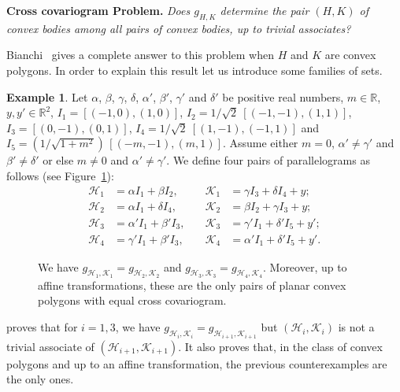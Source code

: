 \documentclass[a4paper]{amsart}
\theoremstyle{definition}
\newtheorem{example}[theorem]{Example}
\numberwithin{equation}{section}
\begin{document}
\textbf{Cross covariogram Problem.}
\emph{Does $g_{H,K}$ determine the pair $(H,K)$ of convex bodies among all pairs of convex bodies, up to trivial associates?}
\smallskip

Bianchi~\cite{B4} gives a complete answer to this problem when $H$ and $K$ are convex polygons. In order to explain this result let us introduce some families of sets.
\begin{example}\label{parallelograms}
Let ${{\alpha}}$, ${{\beta}}$, ${{\gamma}}$, ${{\delta}}$, ${{\alpha}}'$, ${{\beta}}'$, ${{\gamma}}'$ and ${{\delta}}'$ be positive real numbers, $m\in{\mathbb{R}}$, $y,y'\in{\mathbb{R}}^2$, $I_1=[(-1,0),(1,0)]$, $I_2=1/\sqrt{2}\ [(-1,-1),(1,1)]$, $I_3=[(0,-1),(0,1)]$, $I_4=1/\sqrt{2}\ [(1,-1),(-1,1)]$ and $I_5=(1/\sqrt{1+m^2})\,[(-m,-1),(m,1)]$. Assume either  $m=0$, ${{\alpha}}'\neq {{\gamma}}'$ and ${{\beta}}'\neq{{\delta}}'$ or else $m\neq 0$ and ${{\alpha}}'\neq {{\gamma}}'$. We define four pairs of parallelograms as follows (see Figure~\ref{fig_four_parall}):
\begin{align*}
{{\mathcal H}}_1&={{\alpha}} I_1+{{\beta}} I_2,\quad& {{\mathcal K}}_1&={{\gamma}} I_3+{{\delta}} I_4+y;\\
{{\mathcal H}}_2&={{\alpha}} I_1+{{\delta}} I_4,\quad&  {{\mathcal K}}_2&={{\beta}} I_2+{{\gamma}} I_3+y;\\
{{\mathcal H}}_3&={{\alpha}}' I_1+{{\beta}}' I_3,\quad& {{\mathcal K}}_3&={{\gamma}}' I_1+{{\delta}}' I_5+y';\\
{{\mathcal H}}_4&={{\gamma}}' I_1+{{\beta}}' I_3,\quad& {{\mathcal K}}_4&={{\alpha}}' I_1+{{\delta}}' I_5+y'.
\end{align*}

\begin{figure}
\begin{center}

\end{center}
\caption{We have $g_{{{\mathcal H}}_1,{{\mathcal K}}_1}=g_{{{\mathcal H}}_{2},{{\mathcal K}}_{2}}$ and $g_{{{\mathcal H}}_3,{{\mathcal K}}_3}=g_{{{\mathcal H}}_{4},{{\mathcal K}}_{4}}$. Moreover, up to affine transformations, these are the only pairs of planar convex polygons with equal cross covariogram.}
\label{fig_four_parall}
\end{figure}

\cite{B4} proves that for $i=1,3$, we have $g_{{{\mathcal H}}_i,{{\mathcal K}}_i}=g_{{{\mathcal H}}_{i+1},{{\mathcal K}}_{i+1}}$ but $({{\mathcal H}}_i,{{\mathcal K}}_i)$ is not a trivial associate of $({{\mathcal H}}_{i+1},{{\mathcal K}}_{i+1})$. It also proves that, in the class of convex polygons and up to an affine transformation, the previous counterexamples are the only ones.
\end{example}
\end{document}
